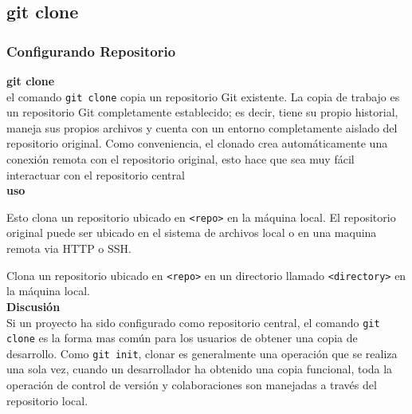\documentclass[8pt]{beamer}
\begin{document}
\subsection{git clone}

\begin{frame}
\frametitle{Configurando Repositorio}
\textbf{git clone}\\
\medskip
el comando \texttt{git clone} copia un repositorio Git existente. La copia de trabajo es un repositorio Git completamente establecido; es decir, tiene su propio historial, maneja sus propios archivos y cuenta con un entorno completamente aislado del repositorio original.
Como conveniencia, el clonado crea autom\'aticamente una conexi\'on remota con el repositorio original, esto hace que sea muy f\'acil interactuar con el repositorio central\\
\medskip
\textbf{uso}\\
\medskip

Esto clona un repositorio ubicado en \texttt{<repo>} en la m\'aquina local. El repositorio original puede ser ubicado en el sistema de archivos local o en una maquina remota via HTTP o SSH.

Clona un repositorio ubicado en \texttt{<repo>} en un directorio llamado \texttt{<directory>} en la m\'aquina local.\\
\medskip
\textbf{Discusi\'on}\\
\medskip
Si un proyecto ha sido configurado como repositorio central, el comando \texttt{git clone} es la forma mas com\'un para los usuarios de obtener una copia de desarrollo. Como \texttt{git init},  clonar es generalmente una operaci\'on que se realiza una sola vez, cuando un desarrollador ha obtenido una copia funcional, toda la operaci\'on de control de versi\'on y colaboraciones son manejadas a trav\'es del repositorio local.
\end{frame}
\end{document}
